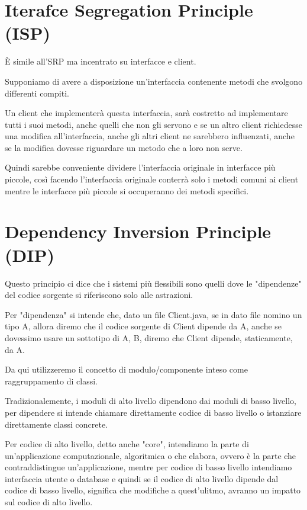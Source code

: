 \newpage
\section{Iterafce Segregation Principle (ISP)}

È simile all’SRP ma incentrato su interfacce e client.
\smallskip

Supponiamo di avere a disposizione un'interfaccia contenente metodi che svolgono differenti compiti.

Un client che implementerà questa interfaccia, sarà costretto ad implementare tutti i suoi metodi, anche quelli che non gli servono e se un altro client richiedesse una 
modifica all’interfaccia, anche gli altri client ne sarebbero influenzati, anche se la modifica dovesse riguardare un metodo che a loro non serve.

Quindi sarebbe conveniente dividere l'interfaccia originale in interfacce più piccole, così facendo l'interfaccia originale conterrà solo i metodi comuni ai client 
mentre le interfacce più piccole si occuperanno dei metodi specifici.

\section{Dependency Inversion Principle (DIP)}

Questo principio ci dice che i sistemi più flessibili sono quelli dove le "dipendenze" del codice sorgente si riferiscono solo alle astrazioni.

Per "dipendenza" si intende che, dato un file Client.java, se in dato file nomino un tipo A, allora diremo che il codice sorgente di Client dipende da A, anche se 
dovessimo usare un sottotipo di A, B, diremo che Client dipende, staticamente, da A.

Da qui utilizzeremo il concetto di modulo/componente inteso come raggruppamento di classi.
\smallskip

Tradizionalemente, i moduli di alto livello dipendono dai moduli di basso livello, per dipendere si intende chiamare direttamente codice di basso livello o istanziare
direttamente classi concrete.

Per codice di alto livello, detto anche "core", intendiamo la parte di un'applicazione computazionale, algoritmica o che elabora, ovvero è la parte che contraddistingue 
un'applicazione, mentre per codice di basso livello intendiamo interfaccia utente o database e quindi se il codice di alto livello dipende dal codice di basso livello, 
significa che modifiche a quest'ulitmo, avranno un impatto sul codice di alto livello.
\smallskip

